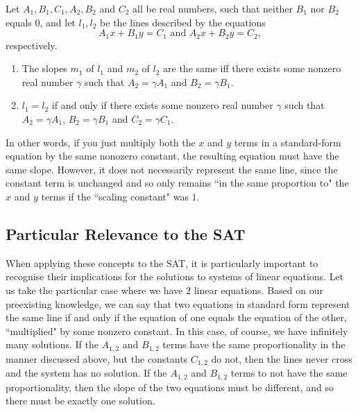 \documentclass{article}
\begin{document}
	Let $A_1, B_1, C_1, A_2, B_2$ and $C_2$ all be real numbers, such that neither $B_1$ nor $B_2$ equals $0$, and let $l_1, l_2$ be the lines described by the equations
	\[A_1x+B_1y=C_1 \text{ and } A_2x+B_2y=C_2,\]
	respectively.
	
	\begin{enumerate}
		\item The slopes $m_1$ of $l_1$ and $m_2$ of $l_2$ are the same iff there exists some nonzero real number $\gamma$ such that $A_2 = \gamma A_1$ and $B_2 = \gamma B_1$.
		\item $l_1 = l_2$ if and only if there exists some nonzero real number $\gamma$ such that $A_2 = \gamma A_1$, $B_2 = \gamma B_1$ and $C_2 = \gamma C_1$.
	\end{enumerate}
	
	In other words, if you just multiply both the $x$ and $y$ terms in a standard-form equation by the same nonozero constant, the resulting equation must have the same slope. However, it does not necessarily represent the same line, since the constant term is unchanged and so only remains ``in the same proportion to" the $x$ and $y$ terms if the ``scaling constant" was $1$.
	
	\subsection*{Particular Relevance to the SAT}
	When applying these concepts to the SAT, it is particularly important to recognise their implications for the solutions to systems of linear equations. Let us take the particular case where we have $2$ linear equations. Based on our preexisting knowledge, we can say that two equations in standard form represent the same line if and only if the equation of one equals the equation of the other, ``multiplied" by some nonzero constant. In this case, of course, we have infinitely many solutions. If the $A_{1,2}$ and $B_{1,2}$ terms have the same proportionality in the manner discussed above, but the constants $C_{1,2}$ do not, then the lines never cross and the system has no solution. If the $A_{1,2}$ and $B_{1,2}$ terms to not have the same proportionality, then the slope of the two equations must be different, and so there must be exactly one solution.
\end{document}
